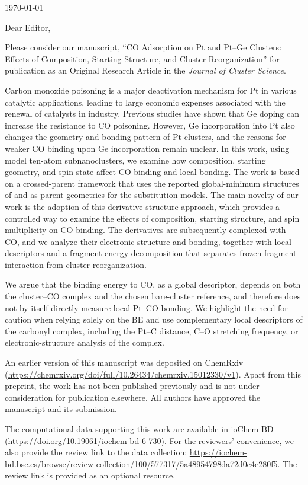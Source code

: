 \documentclass[11pt]{article}
\begin{document}
\today

Dear Editor,

Please consider our manuscript, ``CO Adsorption on Pt and Pt--Ge Clusters: Effects of Composition, Starting Structure, and Cluster Reorganization'' for publication as an Original Research Article in the \textit{Journal of Cluster Science}.

Carbon monoxide poisoning is a major deactivation mechanism for Pt in various
catalytic applications, leading to large economic expenses associated with the
renewal of catalysts in industry. Previous studies have shown that Ge doping can
increase the resistance to CO poisoning. However, Ge incorporation into Pt also
changes the geometry and bonding pattern of Pt clusters, and the reasons for
weaker CO binding upon Ge incorporation remain unclear. In this work, using
model ten-atom subnanoclusters, we examine how composition, starting geometry,
and spin state affect CO binding and local bonding. The work is based on a
crossed-parent framework that uses the reported global-minimum structures of  and  as parent geometries for the substitution models. The main novelty of our work is the adoption of this derivative-structure approach, which provides a controlled way to examine the effects of composition, starting structure, and spin multiplicity on CO binding. The derivatives are subsequently complexed with CO, and {we analyze their electronic structure and bonding, together with local descriptors and a fragment-energy decomposition that separates frozen-fragment interaction from cluster reorganization}.

We argue that the binding energy to CO, {as a global descriptor, depends on both the cluster--CO complex and the chosen bare-cluster reference, and therefore does not by itself directly measure local Pt--CO bonding}. We highlight the need for caution when relying solely on the BE and {use complementary local descriptors of the carbonyl complex, including} the Pt--C distance, C--O stretching frequency, or electronic-structure analysis of the complex.


An earlier version of this manuscript was deposited on ChemRxiv
(\url{https://chemrxiv.org/doi/full/10.26434/chemrxiv.15012330/v1}). Apart from this preprint,
the work has not been published previously and is not under consideration for
publication elsewhere. All authors have approved the manuscript and its
submission.

The computational data supporting this work are available in ioChem-BD
(\url{https://doi.org/10.19061/iochem-bd-6-730}). For the reviewers' convenience,
we also provide the review link to the data collection:
\url{https://iochem-bd.bsc.es/browse/review-collection/100/577317/5a48954798da72d0e4e280f5}.
The review link is provided as an optional resource.
\end{document}
